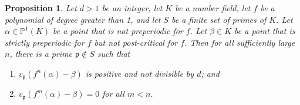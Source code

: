 \documentclass[11pt]{amsart}
\newtheorem{prop}[thm]{Proposition}
\theoremstyle{definition}
\theoremstyle{definition}
\numberwithin{thm}{section}
\numberwithin{equation}{thm}
\newcommand{\bP}{\ensuremath{{\mathbb{P}}}}
\newcommand{\fp}{\ensuremath{{\mathfrak{p}}}}
\begin{document}
\begin{prop}\label{main-d}
  Let $d > 1$ be an integer, let $K$ be a number field, let
  $f$ be a polynomial of degree greater than 1, and let
  $S$ be a finite set of primes of $K$.  Let
  $\alpha \in \bP^1(K)$ be a point that is not preperiodic for
  $f$.  Let $\beta \in K$ be a point that is strictly preperiodic for
  $f$ but not post-critical for $f$.  Then for all
  sufficiently large $n$, there is a prime $\fp \notin S$ such that
  \begin{enumerate}
    \item[(1)] $v_\fp(f^n(\alpha) - \beta)$ is positive and not
      divisible by $d$; and
      \item[(2)] $v_\fp(f^m(\alpha) - \beta) = 0$ for all $m < n$.
  \end{enumerate}
  
\end{prop}
\end{document}
